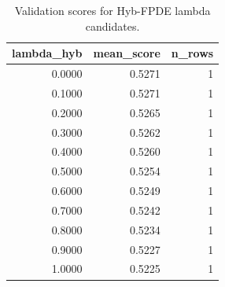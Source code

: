 \begin{table}[t]
\caption{Validation scores for Hyb-FPDE lambda candidates.}
\label{tab:lambda_distribution_computed}
\centering
\begin{tabular}{rrr}
\toprule
lambda\_hyb & mean\_score & n\_rows \\
\midrule
0.0000 & 0.5271 & 1 \\
0.1000 & 0.5271 & 1 \\
0.2000 & 0.5265 & 1 \\
0.3000 & 0.5262 & 1 \\
0.4000 & 0.5260 & 1 \\
0.5000 & 0.5254 & 1 \\
0.6000 & 0.5249 & 1 \\
0.7000 & 0.5242 & 1 \\
0.8000 & 0.5234 & 1 \\
0.9000 & 0.5227 & 1 \\
1.0000 & 0.5225 & 1 \\
\bottomrule
\end{tabular}

\end{table}
